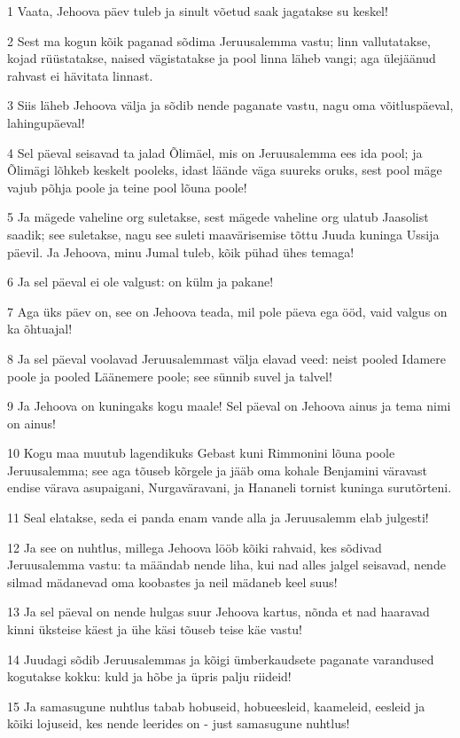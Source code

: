 \par 1 Vaata, Jehoova päev tuleb ja sinult võetud saak jagatakse su keskel!
\par 2 Sest ma kogun kõik paganad sõdima Jeruusalemma vastu; linn vallutatakse, kojad rüüstatakse, naised vägistatakse ja pool linna läheb vangi; aga ülejäänud rahvast ei hävitata linnast.
\par 3 Siis läheb Jehoova välja ja sõdib nende paganate vastu, nagu oma võitluspäeval, lahingupäeval!
\par 4 Sel päeval seisavad ta jalad Õlimäel, mis on Jeruusalemma ees ida pool; ja Õlimägi lõhkeb keskelt pooleks, idast läände väga suureks oruks, sest pool mäge vajub põhja poole ja teine pool lõuna poole!
\par 5 Ja mägede vaheline org suletakse, sest mägede vaheline org ulatub Jaasolist saadik; see suletakse, nagu see suleti maavärisemise tõttu Juuda kuninga Ussija päevil. Ja Jehoova, minu Jumal tuleb, kõik pühad ühes temaga!
\par 6 Ja sel päeval ei ole valgust: on külm ja pakane!
\par 7 Aga üks päev on, see on Jehoova teada, mil pole päeva ega ööd, vaid valgus on ka õhtuajal!
\par 8 Ja sel päeval voolavad Jeruusalemmast välja elavad veed: neist pooled Idamere poole ja pooled Läänemere poole; see sünnib suvel ja talvel!
\par 9 Ja Jehoova on kuningaks kogu maale! Sel päeval on Jehoova ainus ja tema nimi on ainus!
\par 10 Kogu maa muutub lagendikuks Gebast kuni Rimmonini lõuna poole Jeruusalemma; see aga tõuseb kõrgele ja jääb oma kohale Benjamini väravast endise värava asupaigani, Nurgaväravani, ja Hananeli tornist kuninga surutõrteni.
\par 11 Seal elatakse, seda ei panda enam vande alla ja Jeruusalemm elab julgesti!
\par 12 Ja see on nuhtlus, millega Jehoova lööb kõiki rahvaid, kes sõdivad Jeruusalemma vastu: ta määndab nende liha, kui nad alles jalgel seisavad, nende silmad mädanevad oma koobastes ja neil mädaneb keel suus!
\par 13 Ja sel päeval on nende hulgas suur Jehoova kartus, nõnda et nad haaravad kinni üksteise käest ja ühe käsi tõuseb teise käe vastu!
\par 14 Juudagi sõdib Jeruusalemmas ja kõigi ümberkaudsete paganate varandused kogutakse kokku: kuld ja hõbe ja üpris palju riideid!
\par 15 Ja samasugune nuhtlus tabab hobuseid, hobueesleid, kaameleid, eesleid ja kõiki lojuseid, kes nende leerides on - just samasugune nuhtlus!
